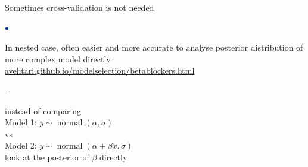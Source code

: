 \documentclass[english,t]{beamer}
\DeclareMathOperator{\normal}{normal}
\newenvironment{list1}{
   \begin{list}{$\color{list1}\bullet$}{\itemsep=6pt}}{
  \end{list}}
\newenvironment{list2}{
  \begin{list}{-}{\baselineskip=12pt\itemsep=2pt}}{
  \end{list}}
\begin{document}
    

\begin{frame}{Sometimes cross-validation is not needed}

\begin{list1}
\item<+-> In nested case, often easier and
  more accurate to analyse posterior distribution of more complex
  model directly \\
  {\small \url{avehtari.github.io/modelselection/betablockers.html}}
  \begin{list2}
  \item instead of comparing\\
    \vspace{0.2\baselineskip}
    Model 1: $y \sim \normal(\alpha, \sigma)$\\
    \vspace{0.2\baselineskip}
    vs\\
    \vspace{0.2\baselineskip}
    Model 2: $y \sim \normal(\alpha + \beta x, \sigma)$\\
    \vspace{0.2\baselineskip}
    look at the posterior of $\beta$ directly
  \end{list2}
\end{list1}

\end{frame}
\end{document}
